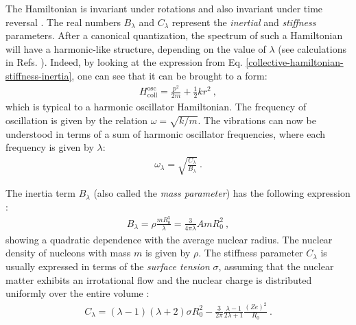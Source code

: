 The Hamiltonian is invariant under rotations and also invariant under time reversal \cite{messiah2014quantum}. The real numbers $B_\lambda$ and $C_\lambda$ represent the \emph{inertial} and \emph{stiffness} parameters. After a canonical quantization, the spectrum of such a Hamiltonian will have a harmonic-like structure, depending on the value of $\lambda$ (see calculations in Refs. \cite{ring2004nuclear,bertulani2007nuclear}). Indeed, by looking at the expression from Eq. \ref{collective-hamiltonian-stiffness-inertia}, one can see that it can be brought to a form:
\begin{align}
    H_\text{coll}^\text{osc}=\frac{p^2}{2m}+\frac{1}{2}kr^2\ ,
    \label{eq-bohr-hamiltonian-oscillator-simple}
\end{align}
which is typical to a harmonic oscillator Hamiltonian. The frequency of oscillation is given by the relation $\omega=\sqrt{k/m}$. The vibrations can now be understood in terms of a sum of harmonic oscillator frequencies, where each frequency is given by $\lambda$:
\begin{align}
\omega_\lambda=\sqrt{\frac{C_\lambda}{B_\lambda}}\ .
\end{align}

The inertia term $B_\lambda$ (also called the \emph{mass parameter}) has the following expression \cite{ring2004nuclear}:
\begin{align}
    B_\lambda=\rho \frac{mR_0^5}{\lambda}=\frac{3}{4\pi\lambda}AmR_0^2\ ,
    \label{inertia-parameters-B}
\end{align}
showing a quadratic dependence with the average nuclear radius. The nuclear density of nucleons with mass $m$ is given by $\rho$. The stiffness parameter $C_\lambda$ is usually expressed in terms of the \emph{surface tension} $\sigma$, assuming that the nuclear matter exhibits an irrotational flow and the nuclear charge is distributed uniformly over the entire volume \cite{ring2004nuclear}:
\begin{align}
    C_\lambda=(\lambda-1)(\lambda+2)\sigma R_0^2-\frac{3}{2\pi}\frac{\lambda-1}{2\lambda+1}\frac{(Ze)^2}{R_0}\ .
    \label{stiffness-parameters-C}
\end{align}


